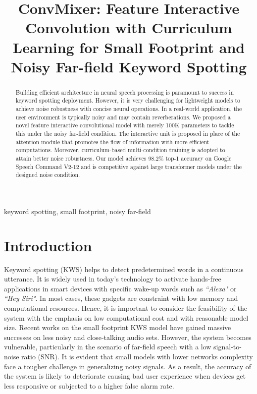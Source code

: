 \documentclass{article}
\title{ConvMixer: Feature Interactive  Convolution with Curriculum Learning for Small Footprint and Noisy Far-field Keyword Spotting}
\begin{document}
\maketitle
\begin{abstract}
Building efficient architecture in neural speech processing is paramount to success in keyword spotting deployment. However, it is very challenging for lightweight models to achieve noise robustness with concise neural operations. In a real-world application, the user environment is typically noisy and may contain reverberations. We proposed a novel feature interactive convolutional model with merely 100K parameters to tackle this under the noisy far-field condition. The interactive unit is proposed in place of the attention module that promotes the flow of information with more efficient computations. Moreover, curriculum-based multi-condition training is adopted to attain better noise robustness. Our model achieves 98.2\% top-1 accuracy on Google Speech Command V2-12 and is competitive against large transformer models under the designed noise condition.  
\end{abstract}
\begin{keywords}
keyword spotting, small footprint, noisy far-field
\end{keywords}


\section{Introduction}
\label{sec:intro}
Keyword spotting (KWS) helps to detect predetermined words in a continuous utterance. It is widely used in today’s technology to activate hands-free applications in smart devices with specific wake-up words such as \textit{``Alexa"} or \textit{``Hey Siri"}. In most cases, these gadgets are constraint with low memory and computational resources. Hence, it is important to consider the feasibility of the system with the emphasis on low computational cost and with reasonable model size. Recent works on the small footprint KWS model \cite{majumdar2020matchboxnet, rybakov2020streaming} have gained massive successes on less noisy and close-talking audio sets. However, the system becomes vulnerable, particularly in the scenario of far-field speech with a low signal-to-noise ratio (SNR). It is evident that small models \cite{arik2017convolutional, prabhavalkar2015automatic} with lower networks complexity face a tougher challenge in generalizing noisy signals. As a result, the accuracy of the system is likely to deteriorate causing bad user experience when devices get less responsive or subjected to a higher false alarm rate. 
\end{document}
